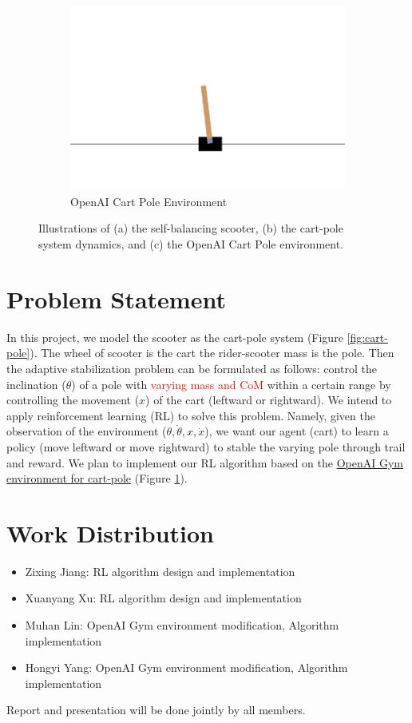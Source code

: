 \documentclass[10pt,a4paper]{article}
\begin{document}
\begin{figure}[H]
\begin{subfigure}[b]{0.3\textwidth}
		\includegraphics[width=\textwidth]{figure/open-ai}
		\caption{OpenAI Cart Pole Environment}
		\label{fig:openai}
	\end{subfigure}
	\caption{Illustrations of (a) the self-balancing scooter, (b) the cart-pole system dynamics, and (c) the OpenAI Cart Pole environment.}
	\label{fig:three graphs}
\end{figure}

\section{Problem Statement}
In this project, we model the scooter as the cart-pole system (Figure \ref{fig:cart-pole}). The wheel of scooter is the cart the rider-scooter mass is the pole. Then the adaptive stabilization problem can be formulated as follows: control the inclination ($\theta$) of a pole with \textcolor{red}{varying mass and CoM} within a certain range by controlling the movement ($x$) of the cart (leftward or rightward).  We intend to apply reinforcement learning (RL) to solve this problem. Namely, given the observation of the environment ($\theta, \dot{\theta}, x, \dot{x}$), we want our agent (cart) to learn a policy (move leftward or move rightward) to stable the varying pole through trail and reward. We plan to implement our RL algorithm based on the \href{https://gymnasium.farama.org/environments/classic_control/cart_pole/}{OpenAI Gym environment for cart-pole} (Figure \ref{fig:openai}). 

\section{Work Distribution}
\begin{itemize}
	\item Zixing Jiang: RL algorithm design and implementation
	\item Xuanyang Xu: RL algorithm design and implementation
	\item Muhan Lin: OpenAI Gym environment modification, Algorithm implementation
	\item Hongyi Yang: OpenAI Gym environment modification, Algorithm implementation
\end{itemize}
Report and presentation will be done jointly by all members.
\end{document}
